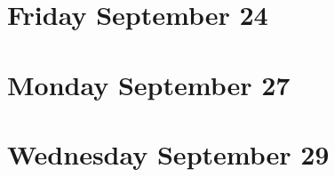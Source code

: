 
\newpage
\section*{Friday September 24}



\newpage
\section*{Monday September 27}


\newpage
\section*{Wednesday September 29}


